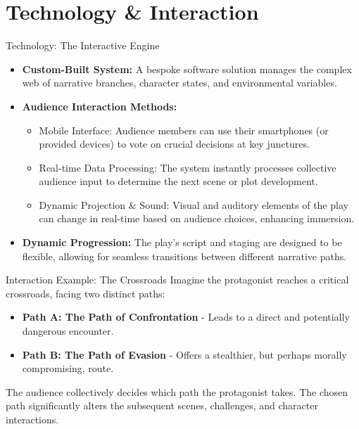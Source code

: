 \documentclass[aspectratio=169]{beamer}
\begin{document}
\section{Technology & Interaction}
\begin{frame}{Technology: The Interactive Engine}
    \begin{itemize}
        \item \textbf{Custom-Built System:} A bespoke software solution manages the complex web of narrative branches, character states, and environmental variables.
        \item \textbf{Audience Interaction Methods:}
        \begin{itemize}
            \item Mobile Interface: Audience members can use their smartphones (or provided devices) to vote on crucial decisions at key junctures.
            \item Real-time Data Processing: The system instantly processes collective audience input to determine the next scene or plot development.
            \item Dynamic Projection & Sound: Visual and auditory elements of the play can change in real-time based on audience choices, enhancing immersion.
        \end{itemize}
        \item \textbf{Dynamic Progression:} The play's script and staging are designed to be flexible, allowing for seamless transitions between different narrative paths.
    \end{itemize}
\end{frame}

\begin{frame}{Interaction Example: The Crossroads}
    Imagine the protagonist reaches a critical crossroads, facing two distinct paths:
    \begin{itemize}
        \item \textbf{Path A: The Path of Confrontation} - Leads to a direct and potentially dangerous encounter.
        \item \textbf{Path B: The Path of Evasion} - Offers a stealthier, but perhaps morally compromising, route.
    \end{itemize}
    The audience collectively decides which path the protagonist takes. The chosen path significantly alters the subsequent scenes, challenges, and character interactions.
\end{frame}
\end{document}
